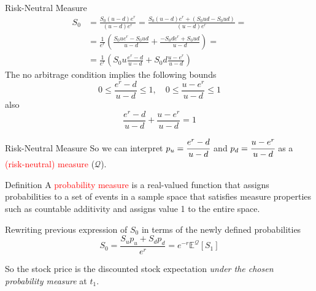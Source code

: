 \documentclass{beamer}
\begin{document}
\begin{frame}{Risk-Neutral Measure}
	\begin{equation*}
		\begin{aligned}
			S_0 &= \frac{S_0(u-d)e^r}{(u-d)e^r} = \frac{S_0(u-d)e^r + (S_0ud - S_0ud)}{(u-d)e^r}=\\
			&= \frac{1}{e^r}\left(\frac{S_0ue^r - S_0ud}{u-d} + \frac{-S_0de^r + S_0ud}{u-d}\right)=\\
			&= \frac{1}{e^r}\left(S_0u\frac{e^r - d}{u-d} + S_0d\frac{u - e^r}{u-d}\right)
		\end{aligned}
	\end{equation*}
	\pause
	The no arbitrage condition implies the following bounds
	\begin{equation*}
		\boxed{0\le\frac{e^r -d}{u-d}\le 1,\quad 0\le\frac{u - e^r}{u-d}\le 1}
	\end{equation*}
	\pause
	also
	\begin{equation}
		\boxed{\frac{e^r -d}{u-d} + \frac{u - e^r}{u-d} = 1}
	\label{eq:risk_neutral_probabilities}
	\end{equation}
\end{frame}

\begin{frame}{Risk-Neutral Measure}
	So we can interpret $p_u=\cfrac{e^r -d}{u-d}$ and $p_d=\cfrac{u - e^r}{u-d}$ as a \textcolor{red}{(risk-neutral) measure} ($\mathcal{Q}$).\vspace{0.3cm}

	\begin{block}{Definition}
A \textcolor{red}{probability measure} is a real-valued function that assigns probabilities to a set of events in a sample space that satisfies measure properties such as countable additivity and assigns value 1 to the entire space.
	\end{block}	
	Rewriting previous expression of $S_0$ in terms of the newly defined probabilities
	\begin{equation}
		S_0 = \frac{S_up_u + S_dp_d}{e^r} = e^{-r}\mathbb{E}^\mathcal{Q}[S_1]
		\label{eq:risk_neutral_price}
	\end{equation}
	
	So the stock price is the discounted stock expectation \emph{under the chosen probability measure} at $t_1$.
\end{frame}
\end{document}
